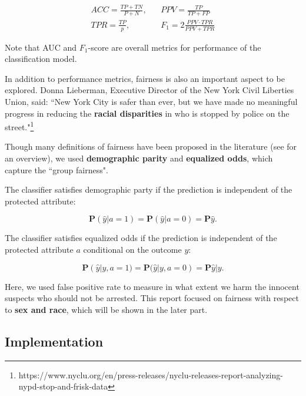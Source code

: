 \vspace{-15pt}
\begin{align*}
    ACC = \frac{TP+TN}{P+N}, ~~&~~ PPV = \frac{TP}{TP+FP} \\
    TPR = \frac{TP}{p}, ~~&~~   F_1 = 2\frac{PPV\cdot TPR} {PPV+TPR} 
\end{align*}



Note that AUC and $F_1$-score are overall metrics for performance of the classification model. 

In addition to performance metrics, fairness is also an important aspect to be explored. Donna Lieberman, Executive Director of the New York Civil Liberties Union, said: ``New York City is safer than ever, but we have made no meaningful progress in reducing the \textbf{racial disparities} in who is stopped by police on the street."\footnote{https://www.nyclu.org/en/press-releases/nyclu-releases-report-analyzing-nypd-stop-and-frisk-data}

Though many definitions of fairness have been proposed in the literature (see \cite{gajane2017formalizing} for an overview), we used \textbf{demographic parity} and \textbf{equalized odds}, which capture the ``group fairness".

The classifier satisfies demographic party if the prediction is independent of the protected attribute:

\vspace{-15pt}
\begin{equation*}
    \mathbf{P}(\hat{y}|a=1) = \mathbf{P}(\hat{y}|a=0) = \mathbf{P}\hat{y}.
\end{equation*}

The classifier satisfies equalized odds if the prediction is independent of the protected attribute $a$ conditional on the outcome $y$:

\vspace{-15pt}
\begin{equation*}
    \mathbf{P}(\hat{y}|y, a=1) = \mathbf{P}(\hat{y}|y, a=0) = \mathbf{P}\hat{y}|y.
\end{equation*}

Here, we used false positive rate to measure in what extent we harm the innocent suspects who should not be arrested. This report focused on fairness with respect to \textbf{sex and race}, which will be shown in the later part.


\subsection{Implementation}

